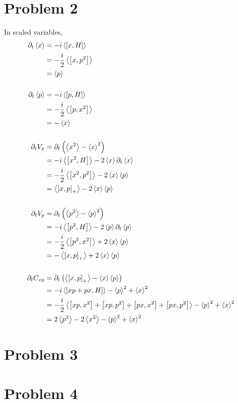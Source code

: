 \documentclass[12pt]{article}
\newcommand{\avg}[1]{\left<#1\right>}
\begin{document}
\section*{Problem 2}
In scaled variables,
\begin{align*}
    \partial_t\avg{x} & = -i\avg{\comm{x}{H}} \\
    & = -\frac{i}{2}\avg{\comm{x}{p^2}} \\
    & = \avg{p} \\ \\
    \partial_t\avg{p} & = -i\avg{\comm{p}{H}} \\
    & = -\frac{i}{2}\avg{\comm{p}{x^2}} \\
    & = -\avg{x} \\ \\
    \partial_tV_x & = \partial_t\left(\avg{x^2} - \avg{x}^2\right) \\
    & = -i\avg{\comm{x^2}{H}} - 2\avg{x}\partial_t\avg{x} \\
    & = -\frac{i}{2}\avg{\comm{x^2}{p^2}} - 2\avg{x}\avg{p} \\
    & = \avg{\comm{x}{p}_+} - 2\avg{x}\avg{p} \\ \\
    \partial_tV_p & = \partial_t\left(\avg{p^2} - \avg{p}^2\right) \\
    & = -i\avg{\comm{p^2}{H}} - 2\avg{p}\partial_t\avg{p} \\
    & = -\frac{i}{2}\avg{\comm{p^2}{x^2}} + 2\avg{x}\avg{p} \\
    & = -\avg{\comm{x}{p}_+} + 2\avg{x}\avg{p} \\ \\
    \partial_tC_{xp} & = \partial_t\left(\avg{\comm{x}{p}_+} - \avg{x}\avg{p}\right) \\
    & = -i\avg{\comm{xp + px}{H}} - \avg{p}^2 + \avg{x}^2 \\
    & = -\frac{i}{2}\avg{\comm{xp}{x^2} + \comm{xp}{p^2} + \comm{px}{x^2} + \comm{px}{p^2}} - \avg{p}^2 + \avg{x}^2 \\
    & = 2\avg{p^2} - 2\avg{x^2} - \avg{p}^2 + \avg{x}^2
\end{align*}


\section*{Problem 3}


\section*{Problem 4}
\end{document}
